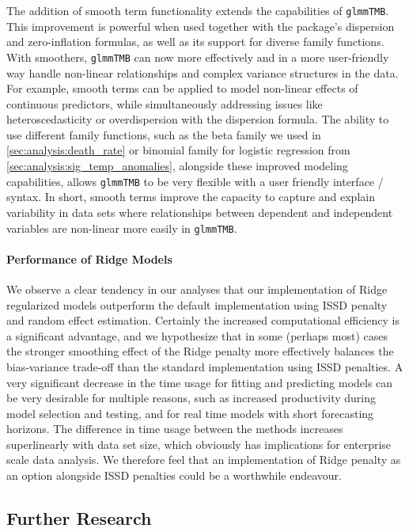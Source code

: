 \documentclass[12pt, twoside,hidelinks]{article}
\theoremstyle{definition}
\numberwithin{equation}{section}
\begin{document}
The addition of smooth term functionality extends the capabilities of \texttt{glmmTMB}.
This improvement is powerful when used together with the package's dispersion and zero-inflation formulas, as well as its support for diverse family functions.
With smoothers, \texttt{glmmTMB} can now more effectively and in a more user-friendly way handle non-linear relationships and complex variance structures in the data. For example, smooth terms can be applied to model non-linear effects of continuous predictors, while simultaneously addressing issues like heteroscedasticity or overdispersion with the dispersion formula. 
The ability to use different family functions, such as the beta family we used in \ref{sec:analysis:death_rate} or binomial family for logistic regression from \ref{sec:analysis:sig_temp_anomalies}, alongside these improved modeling capabilities, allows \texttt{glmmTMB} to be very flexible with a user friendly interface / syntax. 
In short, smooth terms improve the capacity to capture and explain variability in data sets where relationships between dependent and independent variables are non-linear more easily in \texttt{glmmTMB}.

\paragraph{Performance of Ridge Models}

We observe a clear tendency in our analyses that our implementation of Ridge regularized models outperform the default implementation using ISSD penalty and random effect estimation. Certainly the increased computational efficiency is a significant advantage, and we hypothesize that in some (perhaps most) cases the stronger smoothing effect of the Ridge penalty more effectively balances the bias-variance trade-off than the standard implementation using ISSD penalties. A very significant decrease in the time usage for fitting and predicting models can be very desirable for multiple reasons, such as increased productivity during model selection and testing, and for real time models with short forecasting horizons. The difference in time usage between the methods increases superlinearly with data set size, which obviously has implications for enterprise scale data analysis. We therefore feel that an implementation of Ridge penalty as an option alongside ISSD penalties could be a worthwhile endeavour. 


\subsection{Further Research}
\end{document}
